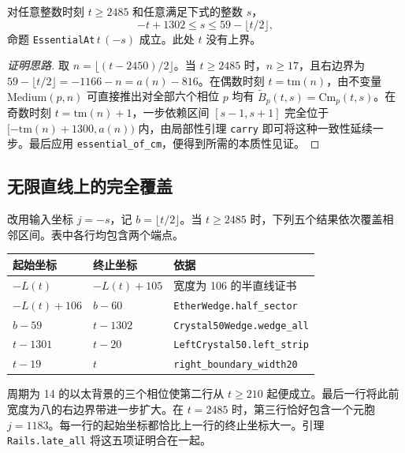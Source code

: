 \begin{theorem}\label{thm:wedge_all}
对任意整数时刻 $t \ge 2485$ 和任意满足下式的整数 $s$，
\begin{equation}\label{eq:wedge_region}
-t + 1302 \le s \le 59 - \lfloor t/2 \rfloor,
\end{equation}
命题 \texttt{EssentialAt}\,$t\,(-s)$ 成立。此处 $t$ 没有上界。
\end{theorem}

\begin{proof}[证明思路]
取 $n = \lfloor (t - 2450) / 2 \rfloor$。当 $t \ge 2485$ 时，$n \ge 17$，且右边界为 $59 - \lfloor t/2 \rfloor = -1166 - n = a(n) - 816$。在偶数时刻 $t = \mathrm{tm}(n)$，由不变量 $\mathrm{Medium}(p, n)$ 可直接推出对全部六个相位 $p$ 均有 $\widetilde B_p(t, s) = \mathrm{Cm}_p(t, s)$。在奇数时刻 $t = \mathrm{tm}(n) + 1$，一步依赖区间 $[s - 1, s + 1]$ 完全位于 $[-\mathrm{tm}(n) + 1300, a(n))$ 内，由局部性引理 \texttt{carry} 即可将这种一致性延续一步。最后应用 \texttt{essential\_of\_cm}，便得到所需的本质性见证。
\end{proof}

\subsection{无限直线上的完全覆盖}\label{sec:five-bands}
改用输入坐标 $j=-s$，记 $b=\lfloor t/2\rfloor$。当 $t\ge2485$ 时，下列五个结果依次覆盖相邻区间。表中各行均包含两个端点。
\begin{center}
\begin{tabular}{lll}
\toprule
起始坐标 & 终止坐标 & 依据 \\
\midrule
$-L(t)$ & $-L(t)+105$ & 宽度为 106 的半直线证书 \\
$-L(t)+106$ & $b-60$ & \texttt{EtherWedge.half\_sector} \\
$b-59$ & $t-1302$ & \texttt{Crystal50Wedge.wedge\_all} \\
$t-1301$ & $t-20$ & \texttt{LeftCrystal50.left\_strip} \\
$t-19$ & $t$ & \texttt{right\_boundary\_width20} \\
\bottomrule
\end{tabular}
\end{center}
周期为 14 的以太背景的三个相位使第二行从 $t\ge210$ 起便成立。最后一行将此前宽度为八的右边界带进一步扩大。在 $t=2485$ 时，第三行恰好包含一个元胞 $j=1183$。每一行的起始坐标都恰比上一行的终止坐标大一。引理 \texttt{Rails.late\_all} 将这五项证明合在一起。

